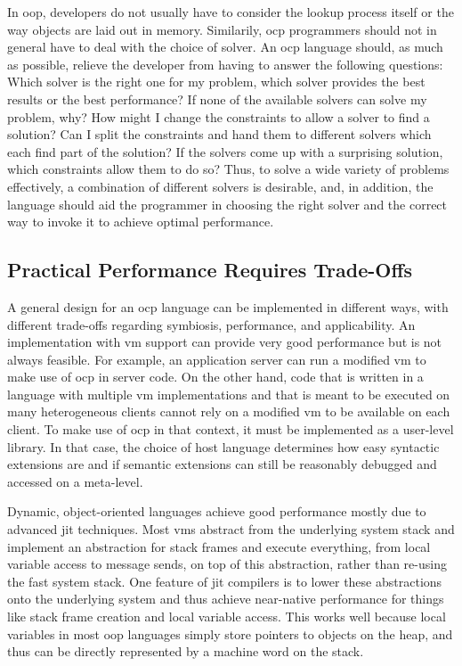 In \ac{oop}, developers do not usually have to consider the lookup
process itself or the way objects are laid out in memory. Similarily,
\ac{ocp} programmers should not in general have to deal with the
choice of solver. An \ac{ocp} language should, as much as possible,
relieve the developer from having to answer the following questions:
Which solver is the right one for my problem, \ie which solver
provides the best results or the best performance? If none of the
available solvers can solve my problem, why? How might I change the
constraints to allow a solver to find a solution? Can I split the
constraints and hand them to different solvers which each find part of
the solution? If the solvers come up with a surprising solution, which
constraints allow them to do so?  Thus, to solve a wide variety of
problems effectively, a combination of different solvers is desirable,
and, in addition, the language should aid the programmer in choosing
the right solver and the correct way to invoke it to achieve optimal
performance.

\subsection*{Practical Performance Requires Trade-Offs}
\label{sec:achi-good-perf}
A general design for an \ac{ocp} language can be implemented in
different ways, with different trade-offs regarding symbiosis,
performance, and applicability. An implementation with \ac{vm} support
can provide very good performance but is not always feasible. For
example, an application server can run a modified \ac{vm} to make use
of \ac{ocp} in server code. On the other hand, code that is written in
a language with multiple \ac{vm} implementations and that is meant to
be executed on many heterogeneous clients cannot rely on a modified
\ac{vm} to be available on each client. To make use of \ac{ocp} in
that context, it must be implemented as a user-level library. In that
case, the choice of host language determines how easy syntactic
extensions are and if semantic extensions can still be reasonably
debugged and accessed on a meta-level.

Dynamic, object-oriented languages achieve good performance mostly due
to advanced \ac{jit} techniques. Most \acp{vm} abstract from the
underlying system stack and implement an abstraction for stack frames
and execute everything, from local variable access to message sends,
on top of this abstraction, rather than re-using the fast system
stack. One feature of \ac{jit} compilers is to lower these
abstractions onto the underlying system and thus achieve near-native
performance for things like stack frame creation and local variable
access. This works well because local variables in most \ac{oop}
languages simply store pointers to objects on the heap, and thus can
be directly represented by a machine word on the stack.

